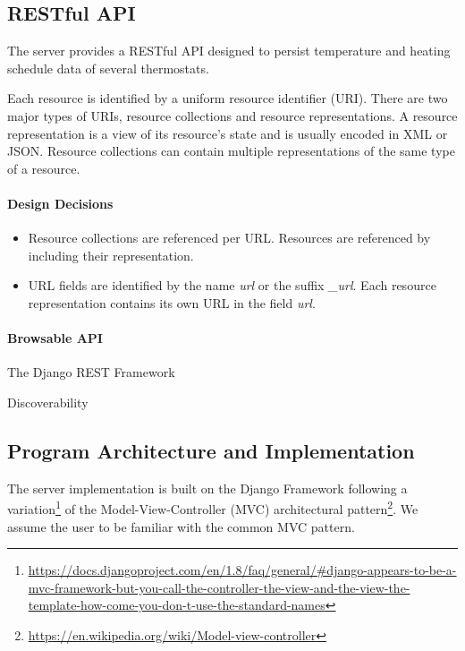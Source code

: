 \subsection{RESTful API}

The server provides a RESTful API designed to persist temperature and heating schedule data of several thermostats.

Each resource is identified by a uniform resource identifier (URI). There are two major types of URIs, resource collections and resource representations. A resource representation is a view of its resource's state and is usually encoded in XML or JSON. Resource collections can contain multiple representations of the same type of a resource.

\paragraph{Design Decisions}

\begin{itemize}
    \itemsep0em
    \item Resource collections are referenced per URL. Resources are referenced by including their representation.
    \item URL fields are identified by the name \emph{url} or the suffix \emph{\_url}. Each resource representation contains its own URL in the field \emph{url}.
\end{itemize}

\paragraph{Browsable API}

The Django REST Framework 

Discoverability



\subsection{Program Architecture and Implementation}

The server implementation is built on the Django Framework following a variation\footnote{\url{https://docs.djangoproject.com/en/1.8/faq/general/\#django-appears-to-be-a-mvc-framework-but-you-call-the-controller-the-view-and-the-view-the-template-how-come-you-don-t-use-the-standard-names}} of the Model-View-Controller (MVC) architectural pattern\footnote{\url{https://en.wikipedia.org/wiki/Model-view-controller}}. We assume the user to be familiar with the common MVC pattern.

